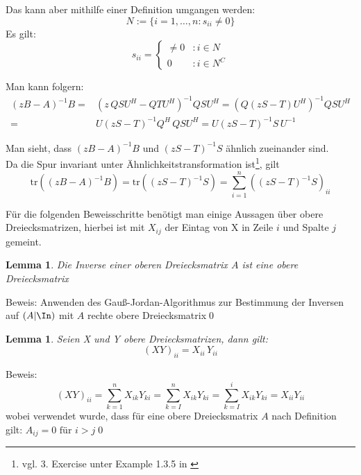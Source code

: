 \documentclass[a4paper,12pt]{report}
\newcommand{\tr}{\text{tr}}
\newcommand{\inv}{^{-1}}
\newcommand{\1}{\mathds{1}}
\theoremstyle{plain} %
\newtheorem{lemma}[theorem]{Lemma}  %
\theoremstyle{definition} %
\theoremstyle{remark}
\begin{document}
            Das kann aber mithilfe einer Definition umgangen werden:
            $$N:=\{i=1,\dots,n: s_{ii}\ne 0\}$$
            Es gilt:
            $$s_{ii} = \begin{cases}
                  \ne 0 & : i\in N\\
                  0 & : i\in N^C
            \end{cases}$$

            Man kann folgern:
            \begin{align*}
                  (zB-A)\inv B =& (z\,QSU^H-QTU^H)\inv QSU^H = (Q(zS-T)U^H)\inv QSU^H \\
                  =& U(zS-T)\inv Q^H\,QSU^H = U(zS-T)\inv S\,U\inv
            \end{align*}

            Man sieht, dass $(zB-A)\inv B$ und  $(zS-T)\inv S$ ähnlich zueinander sind.\\
            Da die Spur invariant unter Ähnlichkeitstransformation ist\footnote{vgl. 3. Exercise unter Example 1.3.5 in \cite{matrixSpur}}, gilt
            \begin{equation}
                  \label{eqn: Haltepunkt Bew Futamura}
                  \tr((zB-A)\inv B) = \tr((zS-T)\inv S) = \sum_{i=1}^{n}((zS-T)\inv S)_{ii}
            \end{equation}

            Für die folgenden Beweisschritte benötigt man einige Aussagen über obere Dreiecksmatrizen, hierbei ist mit $X_{ij}$ der Eintag von X in Zeile $i$ und Spalte $j$ gemeint.

            \begin{lemma}
                  \label{Hilfslemma_Futamura: Inv Dreieck}
                  Die Inverse einer oberen Dreiecksmatrix $A$ ist eine obere Dreiecksmatrix
            \end{lemma}
            Beweis: Anwenden des Gauß-Jordan-Algorithmus zur Bestimmung der Inversen auf $(A|\In)$ mit $A$ rechte obere Dreiecksmatrix\qed

            \begin{lemma}
                  \label{Hilfslemma_Futamura: Prod Dreieck}
                  Seien X und Y obere Dreiecksmatrizen, dann gilt:
                  $$(XY)_{ii} = X_{ii}\, Y_{ii}$$
            \end{lemma}
            Beweis:
            $$(XY)_{ii} = \sum_{k=1}^n X_{ik}Y_{ki} = \sum_{k=I}^{n}X_{ik}Y_{ki} = \sum_{k=I}^{i}X_{ik}Y_{ki} = X_{ii} Y_{ii}$$
            wobei verwendet wurde, dass für eine obere Dreiecksmatrix $A$ nach Definition gilt:
            $A_{ij} = 0 \text{ für }i>j$\qed
\end{document}

